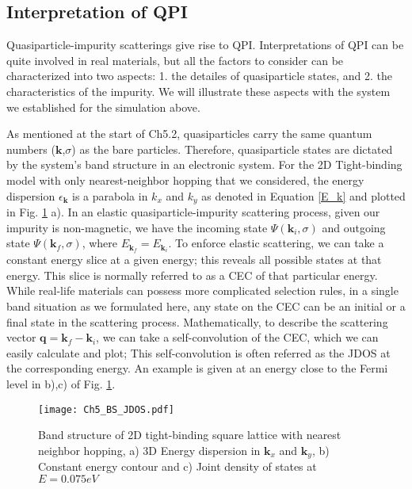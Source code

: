 \subsection{Interpretation of QPI}
Quasiparticle-impurity scatterings give rise to \ac{QPI}. Interpretations of \ac{QPI} can be quite involved in real materials, but all the factors to consider can be characterized into two aspects: 1. the detailes of quasiparticle states, and 2. the characteristics of the impurity. We will illustrate these aspects with the system we established for the simulation above. 

As mentioned at the start of Ch5.2, quasiparticles carry the same quantum numbers ($\textbf{k}$,$\sigma$) as the bare particles. Therefore, quasiparticle states are dictated by the system's band structure in an electronic system. For the 2D Tight-binding model with only nearest-neighbor hopping that we considered, the energy dispersion $\epsilon_{\mathbf{k}}$ is a parabola in $k_x$ and $k_y$ as denoted in Equation \ref{E_k} and plotted in Fig. \ref{fig:ch5_bs} a). In an elastic quasiparticle-impurity scattering process, given our impurity is non-magnetic, we have the incoming state $\Psi(\textbf{k}_i,\sigma)$ and outgoing state $\Psi(\textbf{k}_f,\sigma)$, where $E_{\textbf{k}_f} = E_{\textbf{k}_i}$. To enforce elastic scattering, we can take a constant energy slice at a given energy; this reveals all possible states at that energy. This slice is normally referred to as a \ac{CEC} of that particular energy. While real-life materials can possess more complicated selection rules, in a single band situation as we formulated here, any state on the \ac{CEC} can be an initial or a final state in the scattering process. Mathematically, to describe the scattering vector $\textbf{q} = \textbf{k}_f -\textbf{k}_i$, we can take a self-convolution of the \ac{CEC}, which we can easily calculate and plot; This self-convolution is often referred as the \ac{JDOS} at the corresponding energy. An example is given at an energy close to the Fermi level in b),c) of Fig. \ref{fig:ch5_bs}. 
\begin{figure}
	\centering
	\texttt{[image: Ch5\_BS\_JDOS.pdf]} 
	\caption{Band structure of 2D tight-binding square lattice with nearest neighbor hopping, a) 3D Energy dispersion in $\textbf{k}_x$ and $\textbf{k}_y$, b) Constant energy contour and c) Joint density of states at $E=0.075eV$}
	\label{fig:ch5_bs}
\end{figure}

